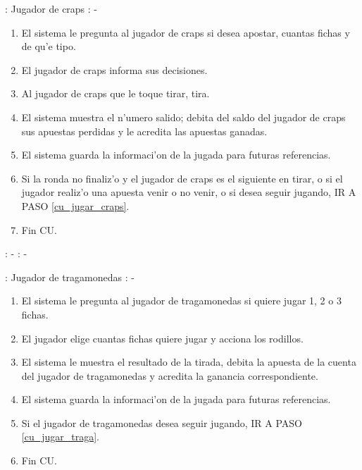 : Jugador de craps \newline
\indent{}: -

\begin{enumerate}
\item El sistema le pregunta al jugador de craps si desea apostar, cuantas fichas y de qu'e tipo. \label{cu_jugar_craps}
\item El jugador de craps informa sus decisiones.
\item Al jugador de craps que le toque tirar, tira.
\item El sistema muestra el n'umero salido; debita del saldo del jugador de craps sus apuestas perdidas y le acredita las apuestas ganadas.
\item El sistema guarda la informaci'on de la jugada para futuras referencias.
\item Si la ronda no finaliz'o y el jugador de craps es el siguiente en tirar, o si el jugador realiz'o una apuesta venir o no venir, o si desea seguir jugando, IR A PASO \ref{cu_jugar_craps}.
\item Fin CU.
\end{enumerate}



: - \newline
\indent{}: -

: Jugador de tragamonedas \newline
\indent{}: -

\begin{enumerate}
\item El sistema le pregunta al jugador de tragamonedas si quiere jugar 1, 2 o 3 fichas. \label{cu_jugar_traga}
\item El jugador elige cuantas fichas quiere jugar y acciona los rodillos.
\item El sistema le muestra el resultado de la tirada, debita la apuesta de la cuenta del jugador de tragamonedas y acredita la ganancia correspondiente.
\item El sistema guarda la informaci'on de la jugada para futuras referencias.
\item Si el jugador de tragamonedas desea seguir jugando, IR A PASO \ref{cu_jugar_traga}.
\item Fin CU.
\end{enumerate}




